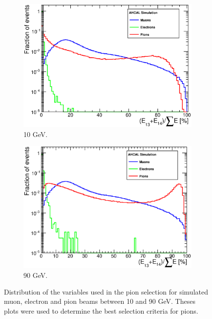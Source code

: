 \begin{figure}[htbp!]
\begin{subfigure}[t]{0.49\textwidth}
		\includegraphics[width=1\linewidth]{../Thesis_Plots/Timing/Pions/Plots/SelectionCut_EnergyLastLayers_10GeV.eps}
		\caption{10 GeV.} \label{fig:pi10GeV_Elast}
	\end{subfigure}
	\hfill
	\begin{subfigure}[t]{0.49\textwidth}
		\centering
		\includegraphics[width=1\linewidth]{../Thesis_Plots/Timing/Pions/Plots/SelectionCut_EnergyLastLayers_90GeV.eps}
		\caption{90 GeV.} \label{fig:pi90GeV_Elast}
	\end{subfigure}
	\caption{Distribution of the variables used in the pion selection for simulated muon, electron and pion beams between 10 and 90 GeV. Theses plots were used to determine the best selection criteria for pions.} \label{fig:pionselection}
\end{figure}

